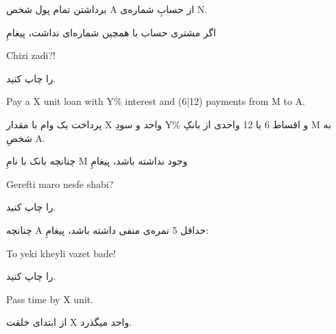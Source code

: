 \documentclass[]{article}
\begin{document}
برداشتن تمام پول شخص A از حسابِ شماره‌ی N.

اگر مشتری حساب با همچین شماره‌ای نداشت، پیغامِ

\begin{tcolorbox}[boxrule=0pt]
	\begin{latin}
  	  \large{
  	  	Chizi zadi?!
		}
	\end{latin}
\end{tcolorbox}

را چاپ کنید.


\hrulefill





\begin{tcolorbox}[boxrule=0pt]
	\begin{latin}
  	  \large{
  	  	Pay a X unit loan with Y\% interest and (6|12) payments from M to A.
		}
	\end{latin}
\end{tcolorbox}

پرداخت یک وام با مقدار X واحد و سودِ Y\% و اقساط 6 یا 12 واحدی از بانکِ M به شخصِ A.

چنانچه بانک با نامِ M وجود نداشته باشد، پیغامِ

\begin{tcolorbox}[boxrule=0pt]
	\begin{latin}
  	  \large{
  	  	Gerefti maro nesfe shabi?
		}
	\end{latin}
\end{tcolorbox}

را چاپ کنید.

چنانچه A حداقل 5 نمره‌ی منفی داشته باشد، پیغامِ:

\begin{tcolorbox}[boxrule=0pt]
	\begin{latin}
  	  \large{
  	  	To yeki kheyli vazet bade!
		}
	\end{latin}
\end{tcolorbox}

را چاپ کنید.




\hrulefill



\begin{tcolorbox}[boxrule=0pt]
	\begin{latin}
  	  \large{
  	  	Pass time by X unit.
		}
	\end{latin}
\end{tcolorbox}

از ابتدای خلقت X واحد میگذرد.
\end{document}
